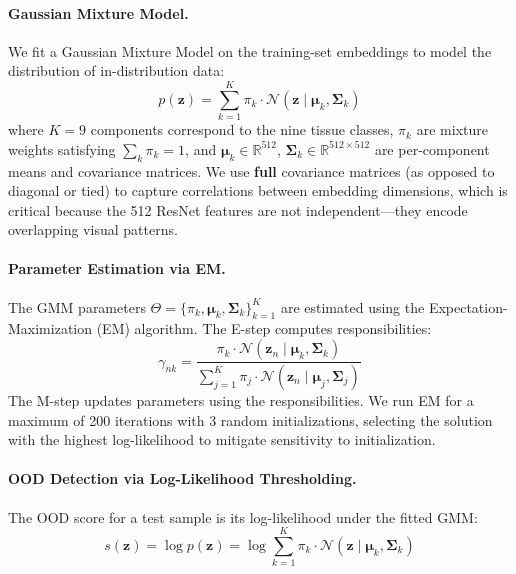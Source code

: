 \documentclass{article}
\begin{document}
\paragraph{Gaussian Mixture Model.}
We fit a Gaussian Mixture Model on the training-set embeddings to model the distribution of in-distribution data:
\begin{equation}
    p(\mathbf{z}) = \sum_{k=1}^{K} \pi_k \cdot \mathcal{N}(\mathbf{z} \mid \boldsymbol{\mu}_k, \boldsymbol{\Sigma}_k)
    \label{eq:gmm}
\end{equation}
where $K = 9$ components correspond to the nine tissue classes, $\pi_k$ are mixture weights satisfying $\sum_k \pi_k = 1$, and $\boldsymbol{\mu}_k \in \mathbb{R}^{512}$, $\boldsymbol{\Sigma}_k \in \mathbb{R}^{512 \times 512}$ are per-component means and covariance matrices. We use \textbf{full} covariance matrices (as opposed to diagonal or tied) to capture correlations between embedding dimensions, which is critical because the 512 ResNet features are not independent---they encode overlapping visual patterns.

\paragraph{Parameter Estimation via EM.}
The GMM parameters $\Theta = \{\pi_k, \boldsymbol{\mu}_k, \boldsymbol{\Sigma}_k\}_{k=1}^K$ are estimated using the Expectation-Maximization (EM) algorithm. The E-step computes responsibilities:
\begin{equation}
    \gamma_{nk} = \frac{\pi_k \cdot \mathcal{N}(\mathbf{z}_n \mid \boldsymbol{\mu}_k, \boldsymbol{\Sigma}_k)}{\sum_{j=1}^{K} \pi_j \cdot \mathcal{N}(\mathbf{z}_n \mid \boldsymbol{\mu}_j, \boldsymbol{\Sigma}_j)}
    \label{eq:estep}
\end{equation}
The M-step updates parameters using the responsibilities. We run EM for a maximum of 200 iterations with 3 random initializations, selecting the solution with the highest log-likelihood to mitigate sensitivity to initialization.

\paragraph{OOD Detection via Log-Likelihood Thresholding.}
The OOD score for a test sample is its log-likelihood under the fitted GMM:
\begin{equation}
    s(\mathbf{z}) = \log p(\mathbf{z}) = \log \sum_{k=1}^{K} \pi_k \cdot \mathcal{N}(\mathbf{z} \mid \boldsymbol{\mu}_k, \boldsymbol{\Sigma}_k)
    \label{eq:ood_score}
\end{equation}
\end{document}
